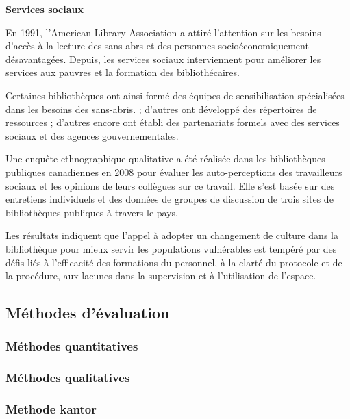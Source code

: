 \documentclass[french,a4paper,12pt]{article}
\begin{document}
\textbf{Services sociaux}

\quad En 1991, l’American Library Association a attiré l’attention sur les besoins d’accès à la lecture des sans-abrs et des personnes socioéconomiquement désavantagées\citep{servicessociaux2008}. Depuis, les services sociaux interviennent pour améliorer les services aux pauvres et la formation des bibliothécaires.  

Certaines bibliothèques ont ainsi formé des équipes de sensibilisation spécialisées dans les besoins des sans-abris. ; d'autres ont développé des répertoires de ressources ; d'autres encore ont établi des partenariats formels avec des services sociaux et des agences gouvernementales. 
 
Une enquête ethnographique qualitative a été réalisée dans les bibliothèques publiques canadiennes en 2008 pour évaluer les auto-perceptions des travailleurs sociaux et les opinions de leurs collègues sur ce travail. Elle s’est basée sur des entretiens individuels et des données de groupes de discussion de trois sites de bibliothèques publiques à travers le pays. 

Les résultats indiquent que l'appel à adopter un changement de culture dans la bibliothèque pour mieux servir les populations vulnérables est tempéré par des défis liés à l'efficacité des formations du personnel, à la clarté du protocole et de la procédure, aux lacunes dans la supervision et à l'utilisation de l'espace. 

 

 







\subsection{Méthodes d'évaluation}

\subsubsection{Méthodes quantitatives}


\subsubsection{Méthodes qualitatives}

\subsubsection{Methode kantor }
\end{document}

